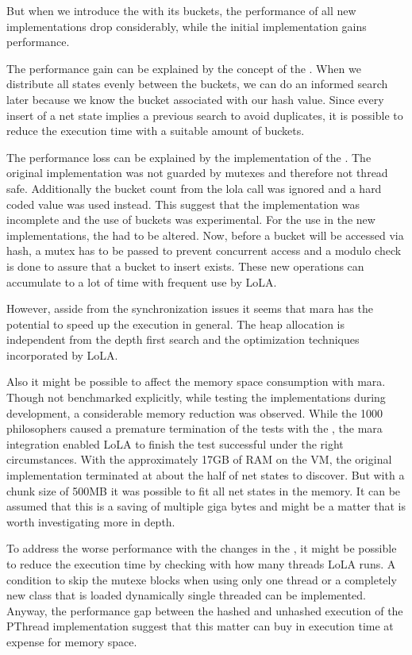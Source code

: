 But when we introduce the  with its buckets, the performance of all new implementations drop considerably, while the initial implementation gains performance. 

The performance gain can be explained by the concept of the . When we distribute all states evenly between the buckets, we can do an informed search later because we know the bucket associated with our hash value. Since every insert of a net state implies a previous search to avoid duplicates, it is possible to reduce the execution time with a suitable amount of buckets.

The performance loss can be explained by the implementation of the . The original implementation was not guarded by mutexes and therefore not thread safe. Additionally the bucket count from the lola call was ignored and a hard coded value was used instead. This suggest that the implementation was incomplete and the use of buckets was experimental. For the use in the new implementations, the  had to be altered. Now, before a bucket will be accessed via hash, a mutex has to be passed to prevent concurrent access and a modulo check is done to assure that a bucket to insert exists. These new operations can accumulate to a lot of time with frequent use by LoLA.

However, asside from the synchronization issues it seems that mara has the potential to speed up the execution in general. The heap allocation is independent from the depth first search and the optimization techniques incorporated by LoLA. 

Also it might be possible to affect the memory space consumption with mara. Though not benchmarked explicitly, while testing the implementations during development, a considerable memory reduction was observed. While the 1000 philosophers caused a premature termination of the tests with the , the mara integration enabled LoLA to finish the test successful under the right circumstances. With the approximately 17GB of RAM on the VM, the original implementation terminated at about the half of net states to discover. But with a chunk size of 500MB it was possible to fit all net states in the memory. It can be assumed that this is a saving of multiple giga bytes and might be a matter that is worth investigating more in depth.

To address the worse performance with the changes in the , it might be possible to reduce the execution time by checking with how many threads LoLA runs. A condition to skip the mutexe blocks when using only one thread or a completely new class that is loaded dynamically single threaded can be implemented. Anyway, the performance gap between the hashed and unhashed execution of the PThread implementation suggest that this matter can buy in execution time at expense for memory space.

